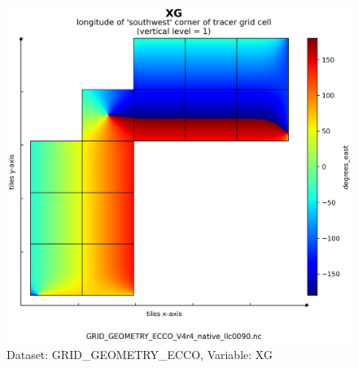 \begin{figure}[H]
\centering
\includegraphics[scale=0.55]{../images/plots/v4r4/native_plots_coords/Geometry_Parameters_for_the_Lat-Lon-Cap_90_(llc90)_Native_Model_Grid_(Version_4_Release_4)/XG.png}
\caption{Dataset: GRID\_GEOMETRY\_ECCO, Variable: XG}
\label{tab:table-GRID_GEOMETRY_ECCO_XG-Plot}
\end{figure}
\newpage
\pagebreak
